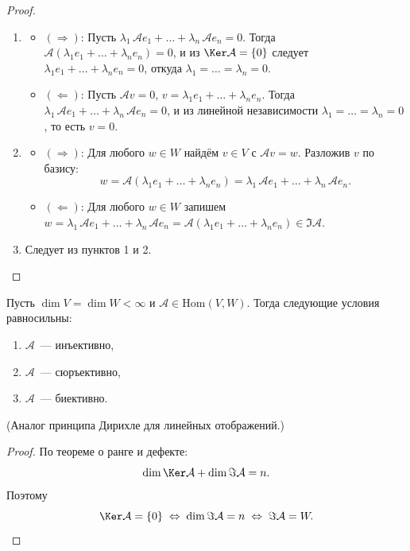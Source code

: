 \begin{proof}
	\begin{enumerate}
		\item
		\begin{itemize}
			\item $(\Rightarrow)$: Пусть $\lambda_1\,\mathcal{A}e_1 + \ldots + \lambda_n\,\mathcal{A}e_n = 0$.
			Тогда $\mathcal{A}(\lambda_1 e_1 + \ldots + \lambda_n e_n) = 0$,
			и из $\Ker\mathcal{A} = \{0\}$ следует $\lambda_1 e_1 + \ldots + \lambda_n e_n = 0$,
			откуда $\lambda_1 = \ldots = \lambda_n = 0$.
			\item $(\Leftarrow)$: Пусть $\mathcal{A}v = 0$, $v = \lambda_1 e_1 + \ldots + \lambda_n e_n$.
			Тогда $\lambda_1\,\mathcal{A}e_1 + \ldots + \lambda_n\,\mathcal{A}e_n = 0$,
			и из линейной независимости $\lambda_1 = \ldots = \lambda_n = 0$, то есть $v = 0$.
		\end{itemize}
		\item
		\begin{itemize}
			\item $(\Rightarrow)$: Для любого $w \in W$ найдём $v \in V$ с $\mathcal{A}v = w$.
			Разложив $v$ по базису:
			\[
			w = \mathcal{A}(\lambda_1 e_1 + \ldots + \lambda_n e_n) = \lambda_1\,\mathcal{A}e_1 + \ldots + \lambda_n\,\mathcal{A}e_n.
			\]
			\item $(\Leftarrow)$: Для любого $w \in W$ запишем $w = \lambda_1\,\mathcal{A}e_1 + \ldots + \lambda_n\,\mathcal{A}e_n = \mathcal{A}(\lambda_1 e_1 + \ldots + \lambda_n e_n) \in \Im\mathcal{A}$.
		\end{itemize}
		\item Следует из пунктов 1 и 2.
	\end{enumerate}
\end{proof}

\begin{Statement}{}{}
	Пусть $\dim V = \dim W < \infty$ и $\mathcal{A} \in \mathrm{Hom}(V, W)$.
	Тогда следующие условия равносильны:
	\begin{enumerate}
		\item $\mathcal{A}$~--- инъективно,
		\item $\mathcal{A}$~--- сюръективно,
		\item $\mathcal{A}$~--- биективно.
	\end{enumerate}
\end{Statement}

\noindent(Аналог принципа Дирихле для линейных отображений.)

\begin{proof}
	По теореме о ранге и дефекте:
	\[
	\dim\Ker\mathcal{A} + \dim\Im\mathcal{A} = n.
	\]
	Поэтому
	\[
	\Ker\mathcal{A} = \{0\}
	\;\Leftrightarrow\; \dim\Im\mathcal{A} = n
	\;\Leftrightarrow\; \Im\mathcal{A} = W. \qedhere
	\]
\end{proof}

